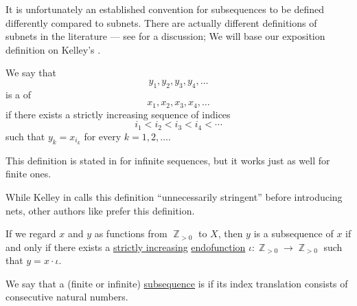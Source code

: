 It is unfortunately an established convention for subsequences to be defined differently compared to subnets. There are actually different definitions of subnets in the literature --- see \cite[\S 7.14]{Schechter1997AnalysisHandbook} for a discussion; We will base our exposition definition on Kelley's \cite[ch. 2]{Kelley1975GeneralTopology}.

\begin{definition}\label{def:subsequence}
  We say that
  \begin{equation}\label{eq:def:subsequence/sub}
    y_1, y_2, y_3, y_4, \ldots
  \end{equation}
  is a  of
  \begin{equation}\label{eq:def:subsequence/original}
    x_1, x_2, x_3, x_4, \ldots
  \end{equation}
  if there exists a strictly increasing sequence of indices
  \begin{equation*}
    i_1 < i_2 < i_3 < i_4 < \cdots
  \end{equation*}
  such that \( y_k = x_{i_k} \) for every \( k = 1, 2, \ldots \).
\end{definition}
\begin{comments}
  \item This definition is stated in \cite[63]{Kelley1975GeneralTopology} for infinite sequences, but it works just as well for finite ones.

  \item While Kelley in \cite[63]{Kelley1975GeneralTopology} calls this definition \enquote{unnecessarily stringent} before introducing nets, other authors like  prefer this definition.

  \item If we regard \( x \) and \( y \) as functions from \( \BbbZ_{>0} \) to \( X \), then \( y \) is a subsequence of \( x \) if and only if there exists a \hyperref[def:order_function/preserving]{strictly increasing} \hyperref[def:function/endofunction]{endofunction} \( \iota: \BbbZ_{>0} \to \BbbZ_{>0} \) such that \( y = x \cdot \iota \).
\end{comments}

\begin{definition}\label{def:contiguous_subsequence}\mimprovised
  We say that a (finite or infinite) \hyperref[def:subsequence]{subsequence} is  if its index translation consists of consecutive natural numbers.
\end{definition}

